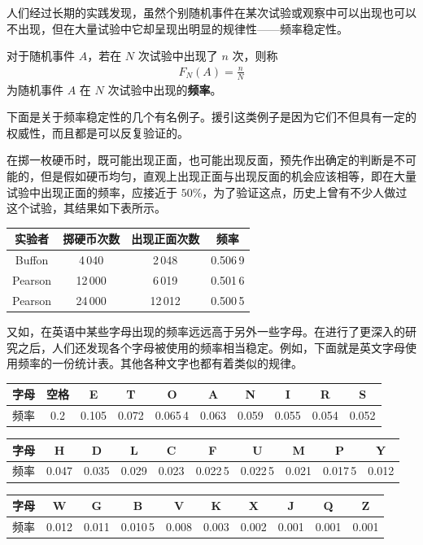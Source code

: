 \documentclass[../../main.tex]{subfiles}
\begin{document}
人们经过长期的实践发现，虽然个别随机事件在某次试验或观察中可以出现也可以不出现，但在大量试验中它却呈现出明显的规律性——频率稳定性。

对于随机事件 $A$，若在 $N$ 次试验中出现了 $n$ 次，则称
\begin{align}
F_N(A)=\frac{n}{N}\label{align:ch01-频率定义}
\end{align}
为随机事件 $A$ 在 $N$ 次试验中出现的\textbf{频率}。

下面是关于频率稳定性的几个有名例子。援引这类例子是因为它们不但具有一定的权威性，而且都是可以反复验证的。

在掷一枚硬币时，既可能出现正面，也可能出现反面，预先作出确定的判断是不可能的，但是假如硬币均匀，直观上出现正面与出现反面的机会应该相等，即在大量试验中出现正面的频率，应接近于 $50\%$，为了验证这点，历史上曾有不少人做过这个试验，其结果如下表所示。

\begin{center}
\begin{tabular}{c|ccc}
实验者 & 掷硬币次数 & 出现正面次数 & 频率 \\
\hline
Buffon & 4\,040 & 2\,048 & 0.506\,9 \\
Pearson & 12\,000 & 6\,019 & 0.501\,6 \\
Pearson & 24\,000 & 12\,012 & 0.500\,5
\end{tabular}
\end{center}

又如，在英语中某些字母出现的频率远远高于另外一些字母。在进行了更深入的研究之后，人们还发现各个字母被使用的频率相当稳定。例如，下面就是英文字母使用频率的一份统计表。其他各种文字也都有着类似的规律。

\begin{center}
\begin{tabular}{c|ccccccccc}
字母 & 空格 & E & T & O & A & N & I & R & S \\
\hline
频率 & 0.2 & 0.105 & 0.072 & 0.065\,4 & 0.063 & 0.059 & 0.055 & 0.054 & 0.052
\end{tabular}
\end{center}

\begin{center}
\begin{tabular}{c|ccccccccc}
字母 & H & D & L & C & F & U & M & P & Y \\
\hline
频率 & 0.047 & 0.035 & 0.029 & 0.023 & 0.022\,5 & 0.022\,5 & 0.021 & 0.017\,5 & 0.012
\end{tabular}
\end{center}

\begin{center}
\begin{tabular}{c|ccccccccc}
字母 & W & G & B & V & K & X & J & Q & Z \\
\hline
频率 & 0.012 & 0.011 & 0.010\,5 & 0.008 & 0.003 & 0.002 & 0.001 & 0.001 & 0.001
\end{tabular}
\end{center}
\end{document}
